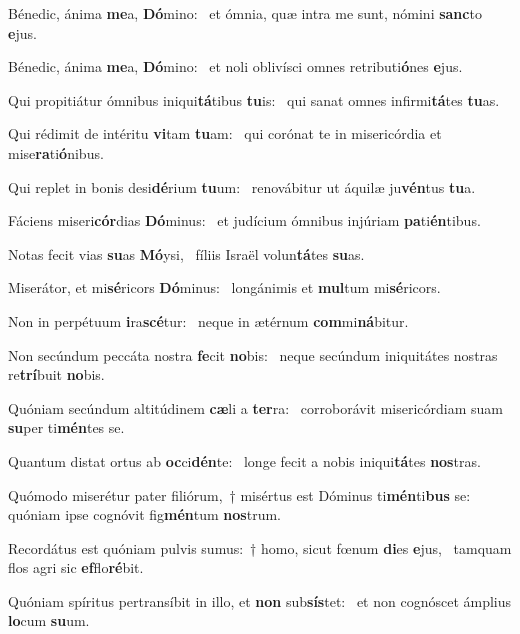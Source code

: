 \item Bénedic, ánima \textbf{me}a, \textbf{Dó}mino:~\psstar{} et ómnia, quæ intra me sunt, nómini \textbf{sanc}to \textbf{e}jus.
\item Bénedic, ánima \textbf{me}a, \textbf{Dó}mino:~\psstar{} et noli oblivísci omnes retributi\textbf{ó}nes \textbf{e}jus.
\item Qui propitiátur ómnibus iniqui\textbf{tá}tibus \textbf{tu}is:~\psstar{} qui sanat omnes infirmi\textbf{tá}tes \textbf{tu}as.
\item Qui rédimit de intéritu \textbf{vi}tam \textbf{tu}am:~\psstar{} qui corónat te in misericórdia et mise\textbf{ra}ti\textbf{ó}nibus.
\item Qui replet in bonis desi\textbf{dé}rium \textbf{tu}um:~\psstar{} renovábitur ut áquilæ ju\textbf{vén}tus \textbf{tu}a.
\item Fáciens miseri\textbf{cór}dias \textbf{Dó}mi\-nus:~\psstar{} et judícium ómnibus injúriam \textbf{pa}ti\textbf{én}tibus.
\item Notas fecit vias \textbf{su}as \textbf{Mó}ysi,~\psstar{} fíliis Israël volun\textbf{tá}tes \textbf{su}as.
\item Miserátor, et mi\textbf{sé}ricors \textbf{Dó}minus:~\psstar{} longánimis et \textbf{mul}tum mi\textbf{sé}ricors.
\item Non in perpétuum \textbf{i}ra\textbf{scé}tur:~\psstar{} neque in ætérnum \textbf{com}mi\textbf{ná}bi\-tur.
\item Non secúndum peccáta nostra \textbf{fe}cit \textbf{no}bis:~\psstar{} neque secúndum iniquitátes nostras re\textbf{trí}buit \textbf{no}bis.
\item Quóniam secúndum altitúdinem \textbf{cæ}li a \textbf{ter}ra:~\psstar{} corroborávit misericórdiam suam \textbf{su}per ti\textbf{mén}tes se.
\item Quantum distat ortus ab \textbf{oc}ci\textbf{dén}te:~\psstar{} longe fecit a nobis iniqui\textbf{tá}tes \textbf{nos}tras.
\item Quómodo miserétur pater filiórum,~† misértus est Dóminus ti\textbf{mén}ti\textbf{bus} se:~\psstar{} quóniam ipse cognóvit fig\textbf{mén}tum \textbf{nos}trum.
\item Recordátus est quóniam pulvis sumus:~† homo, sicut fœnum \textbf{di}es \textbf{e}jus,~\psstar{} tamquam flos agri sic \textbf{ef}flo\textbf{ré}bit.
\item Quóniam spíritus pertransíbit in illo, et \textbf{non} sub\textbf{sís}tet:~\psstar{} et non cognóscet ámplius \textbf{lo}cum \textbf{su}um.
